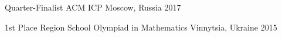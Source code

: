 \begin{cvhonors}
  \cvhonor
    {Quarter-Finalist}
    {ACM ICP}
    {Moscow, Russia}
    {2017}
\end{cvhonors}

\begin{cvhonors}
  \cvhonor
    {1st Place}
    {Region School Olympiad in Mathematics}
    {Vinnytsia, Ukraine}
    {2015}

\end{cvhonors}
